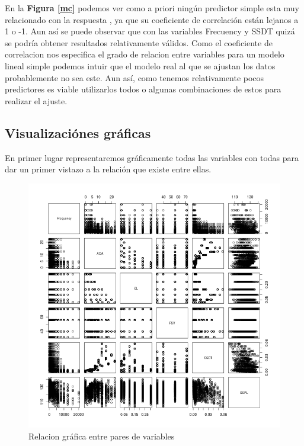 En la \textbf{Figura \ref{mc}} podemos ver como a priori ningún predictor simple esta muy relacionado con la respuesta , ya que su coeficiente de correlación están lejanos a 1 o -1. Aun así se puede observar que con las variables Frecuency y SSDT quizá se podría obtener resultados relativamente válidos. Como el coeficiente de correlacion nos especifica el grado de relacion entre variables para un modelo lineal simple podemos intuir que el modelo real al que se ajustan los datos probablemente no sea este. Aun así, como tenemos relativamente pocos predictores es viable utilizarlos todos o algunas combinaciones de estos para realizar el ajuste.



	\subsection{Visualizaciónes gráficas}
	
En primer lugar representaremos gráficamente todas las variables con todas para dar un primer vistazo a la relación que existe entre ellas.


	\begin{figure}[H]
\centering
\includegraphics[scale=0.5]{pairs.png}
\caption{Relacion gráfica entre pares de variables}
\label{pairs}
\end{figure}

